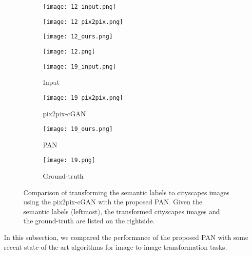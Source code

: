 \documentclass{article}
\begin{document}
\begin{figure*}[!t]
\captionsetup[subfigure]{labelformat=empty}
\centering
 \begin{subfigure}[b]{0.22\textwidth}
    \texttt{[image: 12\_input.png]}%
    \label{fig_first_case}
\end{subfigure}
 \begin{subfigure}[b]{0.22\textwidth}
    \texttt{[image: 12\_pix2pix.png]}%
    \label{fig_first_case}
\end{subfigure}
 \begin{subfigure}[b]{0.22\textwidth}
    \texttt{[image: 12\_ours.png]}%
    \label{fig_first_case}
\end{subfigure}
 \begin{subfigure}[b]{0.22\textwidth}
    \texttt{[image: 12.png]}%
    \label{fig_first_case}
\end{subfigure}
 \begin{subfigure}[b]{0.22\textwidth}
    \texttt{[image: 19\_input.png]}
    \caption{Input}
    \label{fig_first_case}
\end{subfigure}
 \begin{subfigure}[b]{0.22\textwidth}
    \texttt{[image: 19\_pix2pix.png]}
    \caption{pix2pix-cGAN}
    \label{fig_first_case}
\end{subfigure}
 \begin{subfigure}[b]{0.22\textwidth}
    \texttt{[image: 19\_ours.png]}
    \caption{PAN}
    \label{fig_first_case}
\end{subfigure}
 \begin{subfigure}[b]{0.22\textwidth}
    \texttt{[image: 19.png]}
    \caption{Ground-truth}
    \label{fig_first_case}
\end{subfigure}
\caption{Comparison of transforming the semantic labels to cityscapes images using the pix2pix-cGAN with the proposed PAN. Given the semantic labels (leftmost), the transformed cityscapes images and the ground-truth are listed on the rightside.}
\label{cityscapes2}
\end{figure*}


In this subsection, we compared the performance of the proposed PAN with some recent state-of-the-art algorithms for image-to-image transformation tasks.
\end{document}
